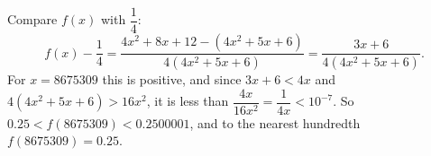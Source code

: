 Compare $f(x)$ with $\dfrac14$:
\[f(x)-\dfrac14=\dfrac{4x^2+8x+12-\left(4x^2+5x+6\right)}{4\left(4x^2+5x+6\right)}=\dfrac{3x+6}{4\left(4x^2+5x+6\right)}.\]
For $x=8675309$ this is positive, and since $3x+6<4x$ and $4\left(4x^2+5x+6\right)>16x^2$, it is less than $\dfrac{4x}{16x^2}=\dfrac1{4x}<10^{-7}$. So $0.25<f(8675309)<0.2500001$, and to the nearest hundredth $f(8675309)=\boxed{0.25}$.
